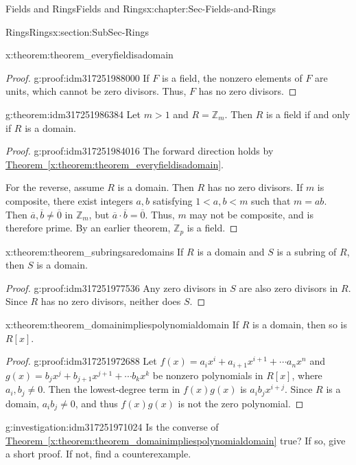 \documentclass[oneside,10pt,]{book}
\newcommand{\xreffont}{\relax}
\numberwithin{equation}{section}
\def\Z{{\mathbb Z}}
\newcommand{\lt}{<}
\begin{document}
\begin{chapterptx}{Fields and Rings}{}{Fields and Rings}{}{}{x:chapter:Sec-Fields-and-Rings}
\begin{sectionptx}{Rings}{}{Rings}{}{}{x:section:SubSec-Rings}
\begin{theorem}{}{}{x:theorem:theorem_everyfieldisadomain}
\end{theorem}
\begin{proof}{}{g:proof:idm317251988000}
If \(F\) is a field, the nonzero elements of \(F\) are units, which cannot be zero divisors. Thus, \(F\) has no zero divisors.%
\end{proof}
\begin{theorem}{}{}{g:theorem:idm317251986384}%
Let \(m > 1\) and \(R = \Z_m\). Then \(R\) is a field if and only if \(R\) is a domain.%
\end{theorem}
\begin{proof}{}{g:proof:idm317251984016}
The forward direction holds by \hyperref[x:theorem:theorem_everyfieldisadomain]{Theorem~{\xreffont\ref{x:theorem:theorem_everyfieldisadomain}}}.%
\par
For the reverse, assume \(R\) is a domain. Then \(R\) has no zero divisors. If \(m\) is composite, there exist integers \(a,b\) satisfying \(1 \lt a,b \lt m\) such that \(m=ab\). Then \(\overline{a},\overline{b}\ne \overline{0}\) in \(\Z_m\), but \(\overline{a}\cdot \overline{b} = \overline{0}\). Thus, \(m\) may not be composite, and is therefore prime. By an earlier theorem, \(\Z_p\) is a field.%
\end{proof}
\begin{theorem}{}{}{x:theorem:theorem_subringsaredomains}%
If \(R\) is a domain and \(S\) is a subring of \(R\), then \(S\) is a domain.%
\end{theorem}
\begin{proof}{}{g:proof:idm317251977536}
Any zero divisors in \(S\) are also zero divisors in \(R\). Since \(R\) has no zero divisors, neither does \(S\).%
\end{proof}
\begin{theorem}{}{}{x:theorem:theorem_domainimpliespolynomialdomain}%
If \(R\) is a domain, then so is \(R[x]\).%
\end{theorem}
\begin{proof}{}{g:proof:idm317251972688}
Let \(f(x) = a_i x^i + a_{i+1} x^{i+1} + \cdots a_n x^n\) and \(g(x) = b_j x^j + b_{j+1} x^{j+1} + \cdots b_k x^k\) be nonzero polynomials in \(R[x]\), where \(a_i, b_j \ne 0\). Then the lowest-degree term in \(f(x) g(x)\) is \(a_i b_j x^{i+j}\). Since \(R\) is a domain, \(a_i b_j\ne 0\), and thus \(f(x)g(x)\) is not the zero polynomial.%
\end{proof}
\begin{investigation}{}{g:investigation:idm317251971024}%
Is the converse of \hyperref[x:theorem:theorem_domainimpliespolynomialdomain]{Theorem~{\xreffont\ref{x:theorem:theorem_domainimpliespolynomialdomain}}} true? If so, give a short proof. If not, find a counterexample.%

\end{investigation}
\end{sectionptx}
\end{chapterptx}
\end{document}
